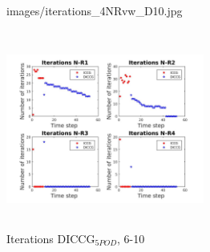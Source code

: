 \documentclass{beamer}
\begin{document}
\begin{frame}[shrink=5]
\begin{figure}[!h]
\begin{minipage}{.4\textwidth}
{images/iterations_4NRvw_D10.jpg}
\caption{Iterations DICCG$_{10}$}
\label{fig:NR_D10}
\end{minipage}%
\hspace{15mm}
\begin{minipage}{.4\textwidth}
 \centering
\includegraphics[width=6.5cm,height=6.5cm,keepaspectratio]
{images/iterations_4NRvw_POD5.jpg}
\caption{Iterations DICCG$_{5POD}$, 6-10}
\label{fig:NR_POD5}
\end{minipage}
\end{figure}
\end{frame}
\end{document}
